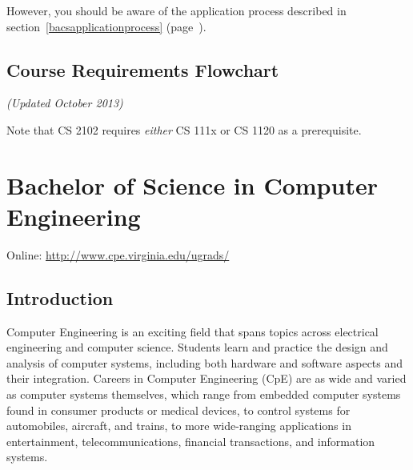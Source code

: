 \documentclass[10pt,letter,twocolumn]{book}
\newcommand{\mychapter}[2]{\chapter{#1}\renewcommand{\leftmark}{\textsc{#2}}}
\newcommand{\mysection}[1]{\section{#1}\renewcommand{\rightmark}{#1}}
\begin{document}
However, you should be aware of the application process described in
section~\ref{bacsapplicationprocess}
(page~\pageref{bacsapplicationprocess}).

\mysection{Course Requirements Flowchart}

\begin{figure*}[h!]
\label{fig:barequirementsflowchart}
{\em (Updated October 2013)}
\begin{center}
\end{center}
\end{figure*}

Note that CS 2102 requires {\em either} CS 111x or CS 1120 as a
prerequisite.


\clearpage
\mychapter{Bachelor of Science in Computer Engineering}{BS CpE Degree}
\label{bscpechapter}

\noindent Online: \url{http://www.cpe.virginia.edu/ugrads/}

\mysection{Introduction}

Computer Engineering is an exciting field that spans topics across
electrical engineering and computer science.  Students learn and
practice the design and analysis of computer systems, including both
hardware and software aspects and their integration. Careers in
Computer Engineering (CpE) are as wide and varied as computer systems
themselves, which range from embedded computer systems found in
consumer products or medical devices, to control systems for
automobiles, aircraft, and trains, to more wide-ranging applications
in entertainment, telecommunications, financial transactions, and
information systems.

\end{document}

